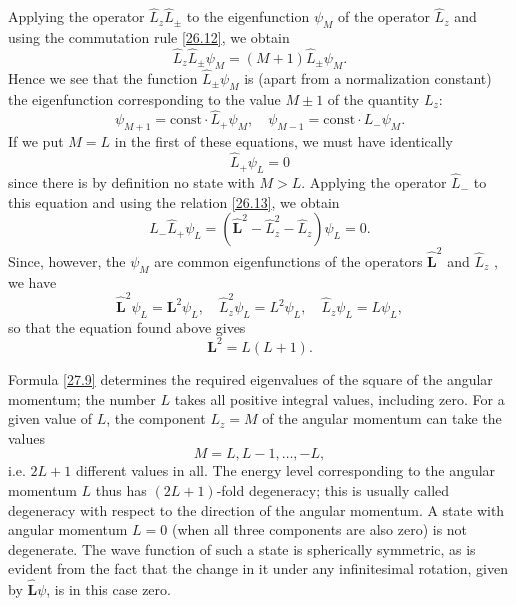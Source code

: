 Applying the operator $ \hat{L}_z\hat{L}_{\pm} $ to the eigenfunction $\psi_M$ of the operator $ \hat{L}_z $ and using the commutation rule \ref{26.12}, we obtain
\begin{equation}\label{27.6}
\hat{L}_z\hat{L}_{\pm}\psi_M=(M+1)\hat{L}_{\pm}\psi_M.
\end{equation}
Hence we see that the function $ \hat{L}_{\pm}\psi_M $ is (apart from a normalization constant) the eigenfunction corresponding to the value $ M \pm 1 $ of the quantity $ L_z $:
\begin{equation}\label{27.7}
\psi_{M+1}=\mathrm{const}\cdot\hat{L}_{+}\psi_M,\quad\psi_{M-1}=\mathrm{const}\cdot L_-\psi_M.
\end{equation}
If we put $ M = L $ in the first of these equations, we must have identically
\begin{equation}\label{27.8}
\hat{L}_+\psi_L=0
\end{equation}
since there is by definition no state with $ M > L $. Applying the operator $ \hat{L}_- $ to this equation and using the relation \eqref{26.13}, we obtain
\[ \hat{L}_-\hat{L}_+\psi_L=(\hat{\bm{L}}^2-\hat{L}_z^2-\hat{L}_z)\psi_L=0. \]
Since, however, the $\psi_M$ are common eigenfunctions of the operators $ \hat{\bm{L}}^2 $ and $ \hat{L}_z $ , we have
\[ \hat{\bm{L}}^2\psi_L=\bm{L}^2\psi_L,\quad\hat{L}_z^2\psi_L=L^2\psi_L,\quad\hat{L}_z\psi_L=L\psi_L, \]
so that the equation found above gives
\begin{equation}\label{27.9}
\bm{L}^2=L(L+1).
\end{equation}


Formula \eqref{27.9} determines the required eigenvalues of the square of the angular momentum; the number $ L $ takes all positive integral values, including zero. For a given value of $ L $, the component $ L_z = M $ of the angular momentum can take the values
\begin{equation}\label{27.10}
M=L,L-1,\dots,-L,
\end{equation}
i.e. $ 2L + 1 $ different values in all. The energy level corresponding to the angular momentum $ L $ thus has $ (2 L + 1) $-fold degeneracy; this is usually called degeneracy with respect to the direction of the angular momentum. A state with angular momentum $ L = 0 $ (when all three components are also zero) is not degenerate. The wave function of such a state is spherically symmetric, as is evident from the fact that the change in it under any infinitesimal rotation, given by $ \hat{\bm{L}}\psi $, is in this case zero.

